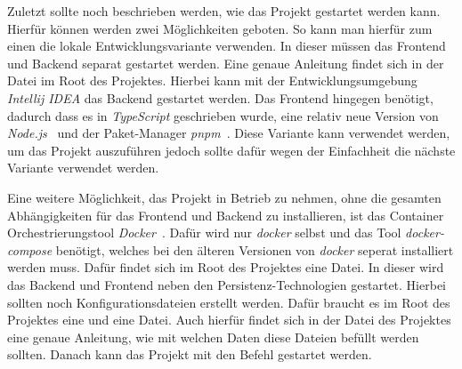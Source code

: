 Zuletzt sollte noch beschrieben werden, wie das Projekt gestartet werden kann.
Hierfür können werden zwei Möglichkeiten geboten. So kann man hierfür zum einen
die lokale Entwicklungsvariante verwenden. In dieser müssen das Frontend und
Backend separat gestartet werden. Eine genaue Anleitung findet sich in der
 Datei im Root des Projektes. Hierbei kann mit der Entwicklungsumgebung
\emph{Intellij IDEA} das Backend gestartet werden. Das Frontend hingegen benötigt,
dadurch dass es in \emph{TypeScript} geschrieben wurde, eine relativ neue Version von
\emph{Node.js}~\cite{node} und der Paket-Manager \emph{pnpm}~\cite{pnpm}.
Diese Variante kann verwendet werden, um das Projekt auszuführen jedoch sollte dafür
wegen der Einfachheit die nächste Variante verwendet werden.

Eine weitere Möglichkeit, das Projekt in Betrieb zu nehmen, ohne die gesamten
Abhängigkeiten für das Frontend und Backend zu installieren, ist das Container
Orchestrierungstool \emph{Docker}~\cite{docker}. Dafür wird nur \emph{docker}
selbst und das Tool \emph{docker-compose} benötigt, welches bei den älteren
Versionen von \emph{docker} seperat installiert werden muss. Dafür findet sich
im Root des Projektes eine  Datei. In dieser wird das
Backend und Frontend neben den Persistenz-Technologien gestartet. Hierbei sollten
noch Konfigurationsdateien erstellt werden. Dafür braucht es im Root des Projektes
eine  und eine  Datei. Auch hierfür findet sich in der 
Datei des Projektes eine genaue Anleitung, wie mit welchen Daten diese Dateien befüllt werden sollten.
Danach kann das Projekt mit den  Befehl gestartet werden.
